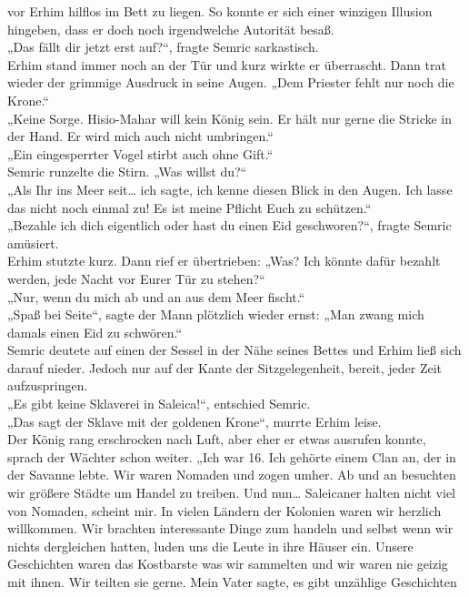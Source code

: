 vor Erhim hilflos im Bett zu liegen. So konnte er sich einer winzigen Illusion hingeben, dass er 
doch noch irgendwelche Autorität besaß. \\
„Das fällt dir jetzt erst auf?“, fragte Semric sarkastisch.\\
Erhim stand immer noch an der Tür und kurz wirkte er überrascht. Dann trat wieder der grimmige 
Ausdruck in seine Augen. „Dem Priester fehlt nur noch die Krone.“\\
„Keine Sorge. Hisio-Mahar will kein König sein. Er hält nur gerne die Stricke in der Hand. Er wird 
mich auch nicht umbringen.“\\
„Ein eingesperrter Vogel stirbt auch ohne Gift.“\\
Semric runzelte die Stirn. „Was willst du?“\\
„Als Ihr ins Meer seit… ich sagte, ich kenne diesen Blick in den Augen. Ich lasse das nicht noch 
einmal zu! Es ist meine Pflicht Euch zu schützen.“\\
„Bezahle ich dich eigentlich oder hast du einen Eid geschworen?“, fragte Semric amüsiert.\\
Erhim stutzte kurz. Dann rief er übertrieben: „Was? Ich könnte dafür bezahlt werden, jede Nacht vor 
Eurer Tür zu stehen?“\\
„Nur, wenn du mich ab und an aus dem Meer fischt.“\\
„Spaß bei Seite“, sagte der Mann plötzlich wieder ernst: „Man zwang mich damals einen Eid zu 
schwören.“\\
Semric deutete auf einen der Sessel in der Nähe seines Bettes und Erhim ließ sich darauf nieder. 
Jedoch nur auf der Kante der Sitzgelegenheit, bereit, jeder Zeit aufzuspringen.\\
„Es gibt keine Sklaverei in Saleica!“, entschied Semric.\\
„Das sagt der Sklave mit der goldenen Krone“, murrte Erhim leise.\\
Der König rang erschrocken nach Luft, aber eher er etwas ausrufen konnte, sprach der Wächter schon 
weiter. „Ich war 16. Ich gehörte einem Clan an, der in der Savanne lebte. Wir waren Nomaden und 
zogen umher. Ab und an besuchten wir größere Städte um Handel zu treiben. Und nun… Saleicaner halten 
nicht viel von Nomaden, scheint mir. In vielen Ländern der Kolonien waren wir herzlich willkommen. 
Wir brachten interessante Dinge zum handeln und selbst wenn wir nichts dergleichen hatten, luden uns 
die Leute in ihre Häuser ein. Unsere Geschichten waren das Kostbarste was wir sammelten und wir 
waren nie geizig mit ihnen. Wir teilten sie gerne. Mein Vater sagte, es gibt unzählige Geschichten 
